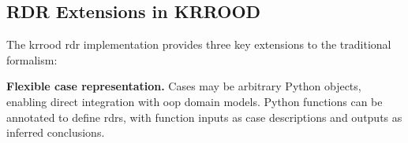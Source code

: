 \documentclass{article}
\begin{document}

\subsection{RDR Extensions in KRROOD}
The \ac{krrood} \ac{rdr} implementation provides three key extensions to the traditional formalism:

\textbf{Flexible case representation.} Cases may be arbitrary Python objects, enabling direct integration with \ac{oop} domain models. Python functions can be annotated to define \acp{rdr}, with function inputs as case descriptions and outputs as inferred conclusions.
\end{document}
